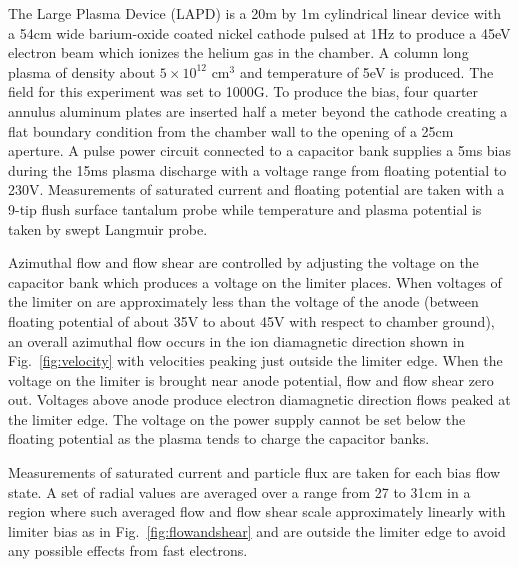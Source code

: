 \documentclass[%
 aip,
 amsmath,amssymb,
 preprint,%
]{revtex4-1}
\begin{document}



The Large Plasma Device \cite{gek91} (LAPD) is a 20m by 1m cylindrical linear device with a 54cm wide barium-oxide coated nickel cathode pulsed at 1Hz to produce a 45eV electron beam which ionizes the helium gas in the chamber. A column long plasma of density about $5 \times 10^{12}$ cm$^{3}$ and temperature of 5eV is produced. The field for this experiment was set to 1000G. To produce the bias, four quarter annulus aluminum plates are inserted half a meter beyond the cathode creating a flat boundary condition from the chamber wall to the opening of a 25cm aperture. A pulse power circuit connected to a capacitor bank supplies a 5ms bias during the 15ms plasma discharge with a voltage range from floating potential to 230V. Measurements of saturated current and floating potential are taken with a 9-tip flush surface tantalum probe while temperature and plasma potential is taken by swept Langmuir probe.

Azimuthal flow and flow shear are controlled by adjusting the voltage on the capacitor bank which produces a voltage on the limiter places. When voltages of the limiter on are approximately less than the voltage of the anode (between floating potential of about 35V to about 45V with respect to chamber ground), an overall azimuthal flow occurs in the ion diamagnetic direction shown in
Fig.~\ref{fig:velocity}%
with velocities peaking just outside the limiter edge. When the voltage on the limiter is brought near anode potential, flow and flow shear zero out. Voltages above anode produce electron diamagnetic direction flows peaked at the limiter edge. The voltage on the power supply cannot be set below the floating potential as the plasma tends to charge the capacitor banks.

Measurements of saturated current and particle flux are taken for each bias flow state. A set of radial values are averaged over a range from 27 to 31cm in a region where such averaged flow and flow shear scale approximately linearly with limiter bias as in 
Fig.~\ref{fig:flowandshear}%
and are outside the limiter edge to avoid any possible effects from fast electrons.

\end{document}
